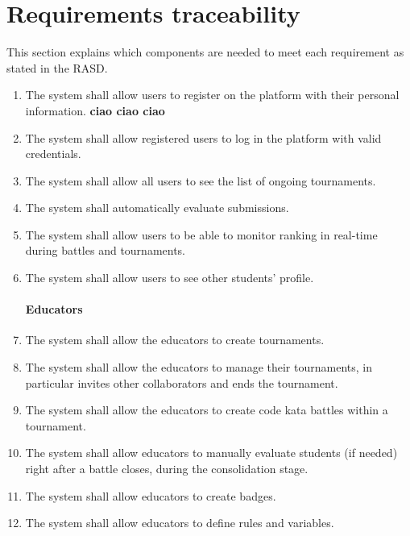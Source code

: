 \chapter{Requirements traceability}
This section explains which components are needed to meet each requirement as stated in the RASD. 

\begin{enumerate}[label=\textbf{R.\arabic*}]
    \subsubsection*{Users}
    \item {} {The system shall allow users to register on the platform with their personal information.} \newline
    \textbf{ciao ciao ciao}
    \item {} {The system shall allow registered users to log in the platform with valid credentials.}
    \item {} {The system shall allow all users to see the list of ongoing tournaments.}
    \item {} {The system shall automatically evaluate submissions.}
    \item {} {The system shall allow users to be able to monitor ranking in real-time during battles and tournaments.}
    \item {} {The system shall allow users to see other students' profile.}
    
    \subsubsection*{Educators}
    \item {} {The system shall allow the educators to create tournaments.}
    \item {} {The system shall allow the educators to manage their tournaments, in particular invites other collaborators and ends the tournament.}
    \item {} {The system shall allow the educators to create code kata battles within a tournament.}
     \item {} {The system shall allow educators to manually evaluate students (if needed) right after a battle closes, during the consolidation stage.}
    \item {} {The system shall allow educators to create badges.}
    \item {} {The system shall allow educators to define rules and variables.}


\end{enumerate}
